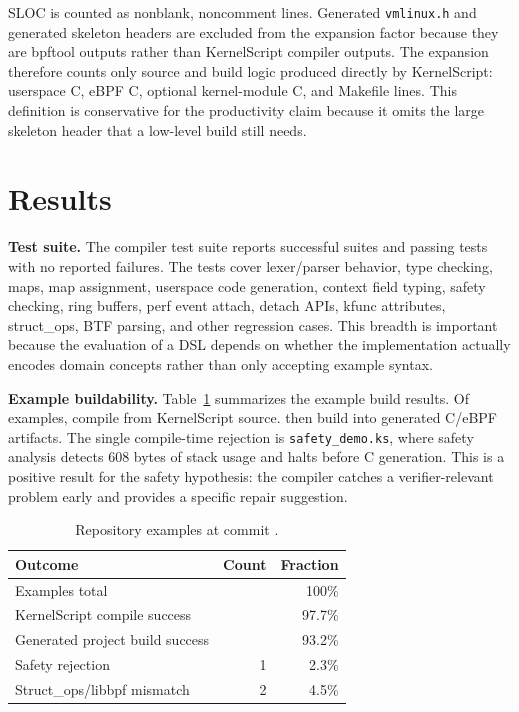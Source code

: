 \documentclass[10pt,twocolumn]{article}
\newcommand{\tool}{KernelScript}
\begin{document}
SLOC is counted as nonblank, noncomment lines.  Generated \texttt{vmlinux.h}
and generated skeleton headers are excluded from the expansion factor because
they are bpftool outputs rather than \tool{} compiler outputs.  The expansion
therefore counts only source and build logic produced directly by \tool{}:
userspace C, eBPF C, optional kernel-module C, and Makefile lines.  This
definition is conservative for the productivity claim because it omits the
large skeleton header that a low-level build still needs.

\section{Results}

\textbf{Test suite.}  The compiler test suite reports \KSTotalUnitSuites{}
successful suites and \KSTotalUnitTests{} passing tests with no reported
failures.  The tests cover lexer/parser behavior, type checking, maps, map
assignment, userspace code generation, context field typing, safety checking,
ring buffers, perf event attach, detach APIs, kfunc attributes, struct\_ops,
BTF parsing, and other regression cases.  This breadth is important because
the evaluation of a DSL depends on whether the implementation actually encodes
domain concepts rather than only accepting example syntax.

\textbf{Example buildability.}  Table~\ref{tab:build} summarizes the example
build results.  Of \KSTotalExamples{} examples, \KSKSCompileOK{} compile from
\tool{} source.  \KSMakeOK{} then build into generated C/eBPF artifacts.  The
single compile-time rejection is \texttt{safety\_demo.ks}, where safety
analysis detects 608 bytes of stack usage and halts before C generation.  This
is a positive result for the safety hypothesis: the compiler catches a
verifier-relevant problem early and provides a specific repair suggestion.

\begin{table}[t]
\centering
\caption{Repository examples at commit \KSCommitShort{}.}
\label{tab:build}
\begin{tabular}{lrr}
\toprule
Outcome & Count & Fraction \\
\midrule
Examples total & \KSTotalExamples{} & 100\% \\
\tool{} compile success & \KSKSCompileOK{} & 97.7\% \\
Generated project build success & \KSMakeOK{} & 93.2\% \\
Safety rejection & 1 & 2.3\% \\
Struct\_ops/libbpf mismatch & 2 & 4.5\% \\
\bottomrule
\end{tabular}
\end{table}
\end{document}
